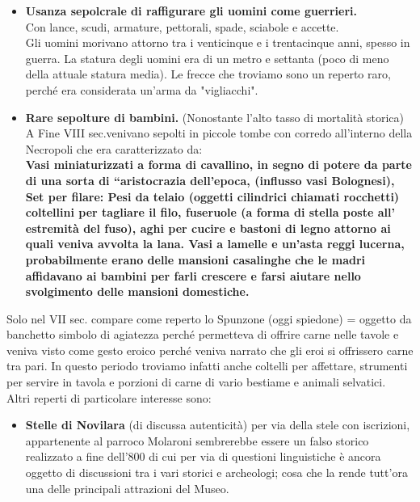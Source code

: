 \documentclass[hidelinks,12pt,a4paper]{article}
\begin{document}
\begin{flushleft}
\begin{itemize}
			\item \textbf{Usanza sepolcrale di raffigurare gli uomini come guerrieri.}\\
			Con lance, scudi, armature, pettorali, spade, sciabole e accette.\\
			Gli uomini morivano attorno tra i venticinque e i trentacinque anni, spesso in guerra.
			 La statura degli uomini era di un metro e settanta (poco di meno della attuale statura media).
			 Le frecce che troviamo sono un reperto raro, perché era considerata un'arma da "vigliacchi".
			
			\item \textbf{Rare sepolture di bambini.} (Nonostante l'alto tasso di mortalità storica)\\
			 A Fine VIII sec.venivano sepolti in piccole tombe con corredo all'interno della Necropoli che era caratterizzato da:
			\\ \textbf{Vasi miniaturizzati a forma di cavallino, in segno di potere da parte di una sorta di “aristocrazia dell’epoca, (influsso vasi Bolognesi), Set per filare: Pesi da telaio (oggetti cilindrici chiamati rocchetti) coltellini per tagliare il filo, fuseruole (a forma di stella poste all’ estremità del fuso), aghi per cucire e bastoni di legno attorno ai quali veniva avvolta la lana. Vasi a lamelle e un'asta reggi lucerna, probabilmente erano delle mansioni casalinghe che le madri affidavano ai bambini per farli crescere e farsi aiutare nello svolgimento delle mansioni domestiche.}\\
		\end{itemize}
		Solo nel VII sec. compare come reperto lo Spunzone (oggi spiedone) = oggetto da banchetto simbolo di agiatezza perché permetteva di offrire carne nelle tavole e veniva visto come gesto eroico perché veniva narrato che gli eroi si offrissero carne tra pari. In questo periodo troviamo infatti anche coltelli per affettare, strumenti per servire in tavola e porzioni di carne di vario bestiame e animali selvatici.\\
		Altri reperti di particolare interesse sono:
		\begin{itemize}
			\item \textbf{Stelle di Novilara} (di discussa autenticità) per via della stele con iscrizioni, appartenente al parroco Molaroni sembrerebbe essere un falso storico realizzato a fine dell’800 di cui per via di questioni linguistiche è ancora oggetto di discussioni tra i vari storici e archeologi; cosa che la rende tutt'ora una delle principali attrazioni del Museo.

\end{itemize}
\end{flushleft}
\end{document}
